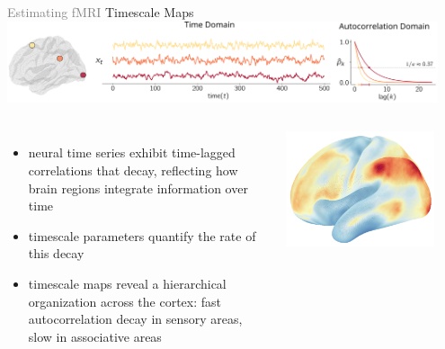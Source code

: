 \documentclass[8pt,aspectratio=169]{beamer}
\begin{document}
\begin{frame}{\textcolor{gray}{Estimating fMRI} Timescale Maps}
    \centering\includegraphics[width=0.95\textwidth]{docs/wnar/timescale.pdf}
    \vfill
    \begin{columns}
        \begin{itemize}
        \item neural time series exhibit time-lagged correlations that decay, reflecting how brain regions integrate information over time
        \item timescale parameters quantify the rate of this decay
        \item timescale maps reveal a hierarchical organization across the cortex: fast autocorrelation decay in sensory areas, slow in associative areas
    \end{itemize}
    \includegraphics[width=0.85\textwidth]{docs/wnar/timescale-brain.pdf}
    \end{columns}
\end{frame}
\end{document}
